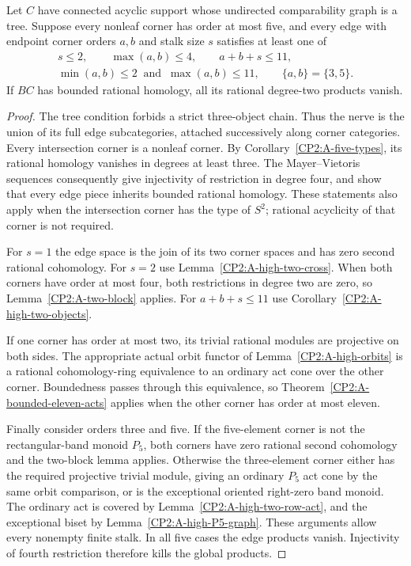\begin{lemma}
\label{CP2:A-five18-tree-edges}
Let $C$ have connected acyclic support whose undirected
comparability graph is a tree. Suppose every nonleaf corner
has order at most five, and every edge with endpoint corner
orders $a,b$ and stalk size $s$ satisfies at least one of
\[
\begin{gathered}
s\leq2,\qquad \max(a,b)\leq4,\qquad a+b+s\leq11,\\
\min(a,b)\leq2\ \text{ and }\ \max(a,b)\leq11,
\qquad \{a,b\}=\{3,5\}.
\end{gathered}
\]
If $BC$ has bounded rational homology, all its rational
degree-two products vanish.
\end{lemma}
\begin{proof}
The tree condition forbids a strict three-object chain.
Thus the nerve is the union of its full edge subcategories,
attached successively along corner categories. Every
intersection corner is a nonleaf corner. By
Corollary~\ref{CP2:A-five-types}, its rational homology
vanishes in degrees at least three. The Mayer--Vietoris
sequences consequently give injectivity of restriction in
degree four, and show that every edge piece inherits
bounded rational homology. These statements also apply
when the intersection corner has the type of $S^2$;
rational acyclicity of that corner is not required.

For $s=1$ the edge space is the join of its two corner
spaces and has zero second rational cohomology. For $s=2$
use Lemma~\ref{CP2:A-high-two-cross}. When both corners
have order at most four, both restrictions in degree two
are zero, so Lemma~\ref{CP2:A-two-block} applies. For
$a+b+s\leq11$ use Corollary~\ref{CP2:A-high-two-objects}.

If one corner has order at most two, its trivial rational
modules are projective on both sides. The appropriate
actual orbit functor of Lemma~\ref{CP2:A-high-orbits}
is a rational cohomology-ring equivalence to an ordinary
act cone over the other corner. Boundedness passes through
this equivalence, so Theorem~\ref{CP2:A-bounded-eleven-acts}
applies when the other corner has order at most eleven.

Finally consider orders three and five. If the five-element
corner is not the rectangular-band monoid $P_5$, both
corners have zero rational second cohomology and the
two-block lemma applies. Otherwise the three-element
corner either has the required projective trivial module,
giving an ordinary $P_5$ act cone by the same orbit
comparison, or is the exceptional oriented right-zero
band monoid. The ordinary act is covered by
Lemma~\ref{CP2:A-high-two-row-act}, and the exceptional
biset by Lemma~\ref{CP2:A-high-P5-graph}. These arguments
allow every nonempty finite stalk. In all five cases the
edge products vanish. Injectivity of fourth restriction
therefore kills the global products.
\end{proof}

